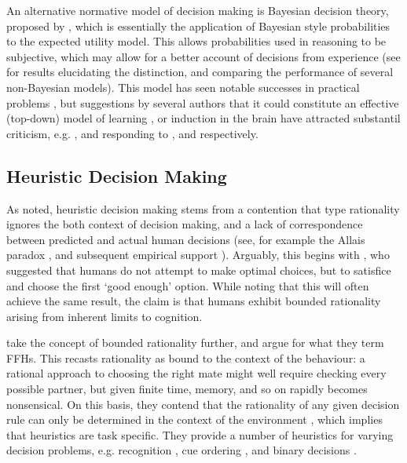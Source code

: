 An alternative normative model of decision making is Bayesian decision theory, proposed by \citet{Robbins1964}, which is essentially the application of Bayesian style probabilities to the expected utility model. This allows probabilities used in reasoning to be subjective, which may allow for a better account of decisions from experience (see \citet{Hau2008,Hertwig2004} for results elucidating the distinction, and comparing the performance of several non-Bayesian models). This model has seen notable successes in practical problems \citep{McNamara1980,Survey2003,Kristensen1997}, but suggestions by several authors  that it could constitute an effective (top-down) model of learning \citep{Tenenbaum2006,Griffiths2010}, or induction \citep{Gallistel2012} in the brain have attracted substantil criticism, e.g. \citet{Bowers2012}, and \citet{Miller2012} responding to \citeauthor{Tenenbaum2006,Griffiths2010}, and \citeauthor{Gallistel2012} respectively.

\subsection{Heuristic Decision Making}\label{sub:heuristic_theories}

As noted, heuristic decision making stems from a contention that \citeauthor{Neumann1953} type rationality ignores the both context of decision making, and a lack of correspondence between predicted and actual human decisions (see, for example the Allais paradox \citep{Society2013}, and subsequent empirical support \citep{Oliver2003,Burke1996}). Arguably, this begins with \citet{Simon1956}, who suggested that humans do not attempt to make optimal choices, but to satisfice and choose the first `good enough' option. While noting that this will often achieve the same result, the claim is that humans exhibit bounded rationality \citep{Simon2000} arising from inherent limits to cognition.

\citet{Gigerenzer1996} take the concept of bounded rationality further, and argue for what they term \acp{FFH}. This recasts rationality as bound to the context of the behaviour: a rational approach to choosing the right mate might well require checking every possible partner, but given finite time, memory, and so on rapidly becomes nonsensical. On this basis, they contend that the rationality of any given decision rule can only be determined in the context of the environment \citep{Todd2003}, which implies that heuristics are task specific. They provide a number of heuristics for varying decision problems, e.g. recognition \citep{Goldstein2002}, cue ordering \citep{Gigerenzer1999,Todd2004}, and binary decisions \citep{Brandstatter2006}.

